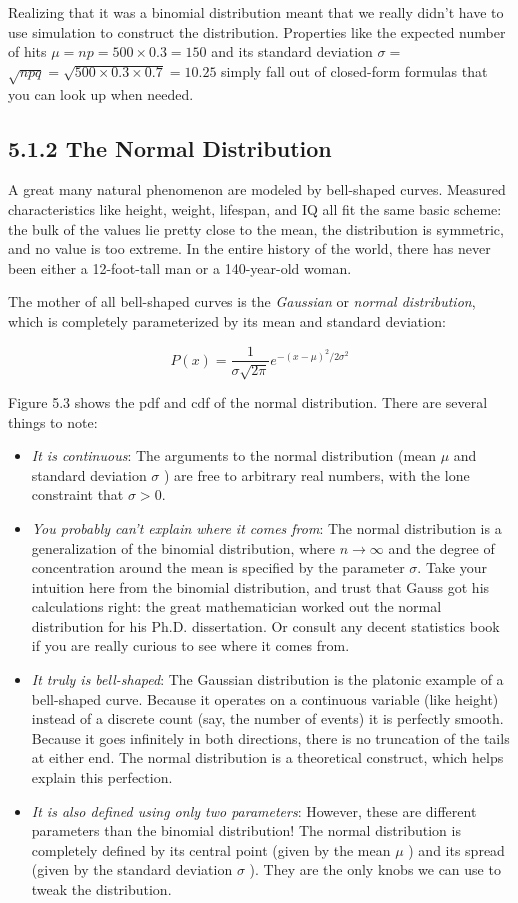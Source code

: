 \documentclass[10pt]{article}
\begin{document}
Realizing that it was a binomial distribution meant that we really didn't have to use simulation to construct the distribution. Properties like the expected number of hits $\mu=n p=500 \times 0.3=150$ and its standard deviation $\sigma=$ $\sqrt{n p q}=\sqrt{500 \times 0.3 \times 0.7}=10.25$ simply fall out of closed-form formulas that you can look up when needed.

\subsection*{5.1.2 The Normal Distribution}
A great many natural phenomenon are modeled by bell-shaped curves. Measured characteristics like height, weight, lifespan, and IQ all fit the same basic scheme: the bulk of the values lie pretty close to the mean, the distribution is symmetric, and no value is too extreme. In the entire history of the world, there has never been either a 12-foot-tall man or a 140-year-old woman.

The mother of all bell-shaped curves is the \emph{Gaussian} or \emph{normal distribution}, which is completely parameterized by its mean and standard deviation:

\[
P(x)=\frac{1}{\sigma \sqrt{2 \pi}} e^{-(x-\mu)^{2} / 2 \sigma^{2}}
\]

Figure 5.3 shows the pdf and cdf of the normal distribution. There are several things to note:
\begin{itemize}
  \item \emph{It is continuous}: The arguments to the normal distribution (mean $\mu$ and standard deviation $\sigma$ ) are free to arbitrary real numbers, with the lone constraint that $\sigma>0$.
  \item \emph{You probably can't explain where it comes from}: The normal distribution is a generalization of the binomial distribution, where $n \rightarrow \infty$ and the degree of concentration around the mean is specified by the parameter $\sigma$. Take your intuition here from the binomial distribution, and trust that Gauss got his calculations right: the great mathematician worked out the normal distribution for his Ph.D. dissertation. Or consult any decent statistics book if you are really curious to see where it comes from.
  \item \emph{It truly is bell-shaped}: The Gaussian distribution is the platonic example of a bell-shaped curve. Because it operates on a continuous variable (like height) instead of a discrete count (say, the number of events) it is perfectly smooth. Because it goes infinitely in both directions, there is no truncation of the tails at either end. The normal distribution is a theoretical construct, which helps explain this perfection.
  \item \emph{It is also defined using only two parameters}: However, these are different parameters than the binomial distribution! The normal distribution is completely defined by its central point (given by the mean $\mu$ ) and its spread (given by the standard deviation $\sigma$ ). They are the only knobs we can use to tweak the distribution.
\end{itemize}
\end{document}

